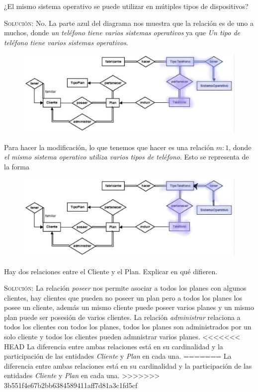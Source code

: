 \documentclass[letterpaper,11pt]{article}
\begin{document}
\begin{itemize}
{    %
    \item ¿El mismo sistema operativo se puede utilizar en mútiples tipos de
    dispositivos?

    \textsc{Solución:} No. La parte azul del diagrama nos muestra que la
    relación es de uno a muchos, donde \textit{un teléfono tiene varios
    sistemas operativos} ya que \textit{Un tipo de teléfono tiene varios
    sistemas operativos}.

    \begin{figure}[H]
        \centering
        \includegraphics[scale=0.4]{./imagenes/modelo9.jpg}
    \end{figure}

    Para hacer la modificación, lo que tenemos que hacer es una relación $m:1$,
    donde \textit{el mismo sistema operativo utiliza varios tipos de teléfono}.
    Esto se representa de la forma

    \begin{figure}[H]
        \centering
        \includegraphics[scale=0.4]{./imagenes/modelo9i.jpg}
    \end{figure}

    \item Hay dos relaciones entre el Cliente y el Plan. Explicar en qué
    difieren.

    \textsc{Solución:} La relación \textit{poseer} nos permite asociar a todos los planes con algunos clientes, hay clientes que pueden no poseer un plan pero a todos los planes los posee un cliente, además un mismo cliente puede poseer varios planes y un mismo plan puede ser posesión de varios clientes.
La relación \textit{administrar} relaciona a todos los clientes con todos los planes, todos los planes son administrados por un solo cliente y todos los clientes pueden admnistrar varios planes.
<<<<<<< HEAD
La diferencia entre ambas relaciones está en su cardinalidad y la participación de las entidades \textit{Cliente} y \textit{Plan} en cada una.
=======
La diferencia entre ambas relaciones está en su cardinalidad y la participación de las entidades \textit{Cliente} y \textit{Plan} en cada una. 
>>>>>>> 3b551f4e67b2bb6384589411aff7d81a3c1fd5cf

}
\end{itemize}
\end{document}
